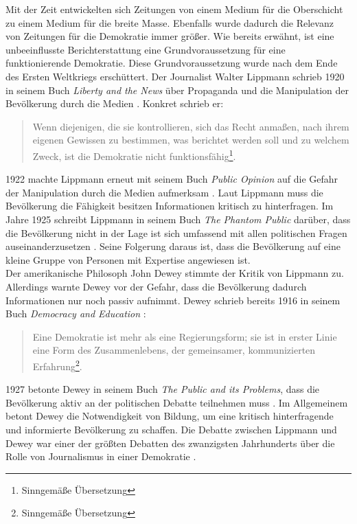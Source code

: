 Mit der Zeit entwickelten sich Zeitungen von einem Medium für die Oberschicht zu einem Medium für die breite Masse.
Ebenfalls wurde dadurch die Relevanz von Zeitungen für die Demokratie immer größer.
Wie bereits erwähnt, ist eine unbeeinflusste Berichterstattung eine Grundvoraussetzung für eine funktionierende Demokratie.
Diese Grundvoraussetzung wurde nach dem Ende des Ersten Weltkriegs erschüttert.
Der Journalist Walter Lippmann schrieb 1920 in seinem Buch \textit{Liberty and the News} über Propaganda und die Manipulation der Bevölkerung durch die Medien \cite{liberty-and-news}.
Konkret schrieb er:
\begin{quote}
    \glqq Wenn diejenigen, die sie kontrollieren, sich das Recht anmaßen, nach ihrem eigenen Gewissen zu bestimmen, was berichtet werden soll und zu welchem Zweck, ist die Demokratie nicht funktionsfähig\grqq{}\footnote{Sinngemäße Übersetzung}.
\end{quote}
1922 machte Lippmann erneut mit seinem Buch \textit{Public Opinion} auf die Gefahr der Manipulation durch die Medien aufmerksam \cite{public-opinion}.
Laut Lippmann muss die Bevölkerung die Fähigkeit besitzen Informationen kritisch zu hinterfragen.
Im Jahre 1925 schreibt Lippmann in seinem Buch \textit{The Phantom Public} darüber, dass die Bevölkerung nicht in der Lage ist sich umfassend mit allen politischen Fragen auseinanderzusetzen \cite{phantom-public}.
Seine Folgerung daraus ist, dass die Bevölkerung auf eine kleine Gruppe von Personen mit Expertise angewiesen ist. \\

Der amerikanische Philosoph John Dewey stimmte der Kritik von Lippmann zu.
Allerdings warnte Dewey vor der Gefahr, dass die Bevölkerung dadurch Informationen nur noch passiv aufnimmt.
Dewey schrieb bereits 1916 in seinem Buch \textit{Democracy and Education} \cite{democracy-and-education}:
\begin{quote}
    \glqq Eine Demokratie ist mehr als eine Regierungsform; sie ist in erster Linie eine Form des Zusammenlebens, der gemeinsamer, kommunizierten Erfahrung\grqq{}\footnote{Sinngemäße Übersetzung}.
\end{quote}
1927 betonte Dewey in seinem Buch \textit{The Public and its Problems}, dass die Bevölkerung aktiv an der politischen Debatte teilnehmen muss \cite{public-problems}.
Im Allgemeinem betont Dewey die Notwendigkeit von Bildung, um eine kritisch hinterfragende und informierte Bevölkerung zu schaffen.
Die Debatte zwischen Lippmann und Dewey war einer der größten Debatten des zwanzigsten Jahrhunderts über die Rolle von Journalismus in einer Demokratie \cite{lippmann-dewey-debate}. \\

